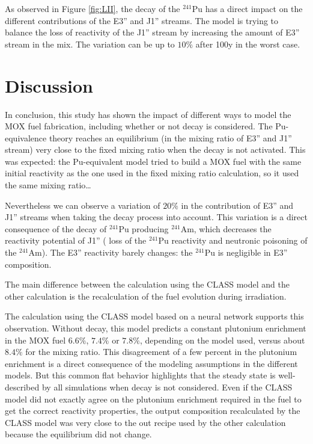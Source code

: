 \documentclass[12pt]{article}
\begin{document}
As observed in Figure \ref{fig:LII}, the decay of the $^{241}$Pu has a direct
impact on the different contributions of the E3'' and J1'' streams. The model is
trying to balance the loss of reactivity of the J1'' stream by increasing the
amount of E3'' stream in the mix. The variation can be up to $10\%$ after 100y
in the worst case.

\section{Discussion}

In conclusion, this study has shown the impact of different ways to model
the MOX fuel fabrication, including whether or not decay is considered.
The Pu-equivalence theory reaches an equilibrium (in the mixing ratio of E3'' and
J1'' stream) very close to the fixed mixing ratio when the decay is not activated.
This was expected: the Pu-equivalent model tried to build a MOX fuel with the same
initial reactivity as the one used in the fixed mixing ratio calculation, so it
used the same mixing ratio\dots  

Nevertheless we can observe a variation of $20\%$ in the contribution of E3''
and J1'' streams  when taking the decay process into account. This variation is
a direct consequence of the decay of $^{241}$Pu producing $^{241}$Am, which
decreases the reactivity potential of J1'' ( loss of the $^{241}$Pu reactivity
and neutronic poisoning of the $^{241}$Am). The E3'' reactivity barely changes:
the $^{241}$Pu is negligible in E3'' composition.

The main difference between the calculation using the CLASS model and the other
calculation is the recalculation of the fuel evolution during irradiation. 

The calculation using the CLASS model based on a neural network supports this
observation. Without decay, this model predicts a constant plutonium enrichment
in the MOX fuel $6.6\%$, $7.4\%$ or $7.8\%$, depending on the model used, versus
about $8.4\%$ for the mixing ratio. This disagreement of a few percent in the
plutonium enrichment is a direct consequence of the modeling assumptions in the
different models.  But this common flat behavior highlights that the steady
state is well-described by all simulations when decay is not considered.  Even
if the CLASS model did not exactly agree on the plutonium enrichment required in
the fuel to get the correct reactivity properties, the output composition
recalculated by the CLASS model was very close to the out recipe used by the
other calculation because the equilibrium did not change.
\end{document}
